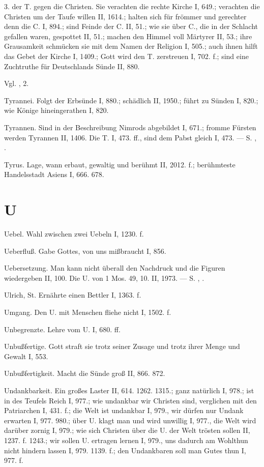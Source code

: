 3.  der T. gegen die Christen. Sie verachten die rechte Kirche I, 649.; verachten die Christen um der Taufe willen II, 1614.; halten sich für frömmer und gerechter denn die C. I, 894.; sind Feinde der C. II, 51.; wie sie über C., die in der Schlacht gefallen waren, gespottet II, 51.; machen den Himmel voll Märtyrer II, 53.; ihre Grausamkeit schmücken sie mit dem Namen der Religion I, 505.; auch ihnen hilft das Gebet der Kirche I, 1409.; Gott wird den T. zerstreuen I, 702. f.; sind eine Zuchtruthe für Deutschlands Sünde II, 880.

Vgl. ,  2.

Tyrannei. Folgt der Erbsünde I, 880.; schädlich II, 1950.; führt zu Sünden I, 820.; wie Könige hineingerathen I, 820.

Tyrannen. Sind in der Beschreibung Nimrods abgebildet I, 671.; fromme Fürsten werden Tyrannen II, 1406. Die T.  I, 473. ff., sind dem Pabst gleich I, 473. — S. , .

Tyrus. Lage, wann erbaut, gewaltig und berühmt II, 2012. f.; berühmteste Handelsstadt Asiens I, 666. 678.

\section{U}

Uebel. Wahl zwischen zwei Uebeln I, 1230. f.

Ueberfluß. Gabe Gottes, von uns mißbraucht I, 856.

Uebersetzung. Man kann nicht überall den Nachdruck und die Figuren wiedergeben II, 100. Die  U. von 1 Mos. 49, 10. II, 1973. — S. , .

Ulrich, St. Ernährte einen Bettler I, 1363. f.

Umgang. Den U. mit Menschen fliehe nicht I, 1502. f.

Unbegrenzte. Lehre vom U. I, 680. ff.

Unbußfertige. Gott straft sie trotz seiner Zusage und trotz ihrer Menge und Gewalt I, 553.

Unbußfertigkeit. Macht die Sünde groß II, 866. 872.

Undankbarkeit. Ein großes Laster II, 614. 1262. 1315.; ganz natürlich I, 978.; ist in des Teufels Reich I, 977.; wie undankbar wir Christen sind, verglichen mit den Patriarchen I, 431. f.; die Welt ist undankbar I, 979., wir dürfen nur Undank erwarten I, 977. 980.; über U. klagt man und wird unwillig I, 977., die Welt wird darüber zornig I, 979.; wie sich Christen über die U. der Welt trösten sollen II, 1237. f. 1243.; wir sollen U. ertragen lernen I, 979., uns dadurch am Wohlthun nicht hindern lassen I, 979. 1139. f.; den Undankbaren soll man Gutes thun I, 977. f.

